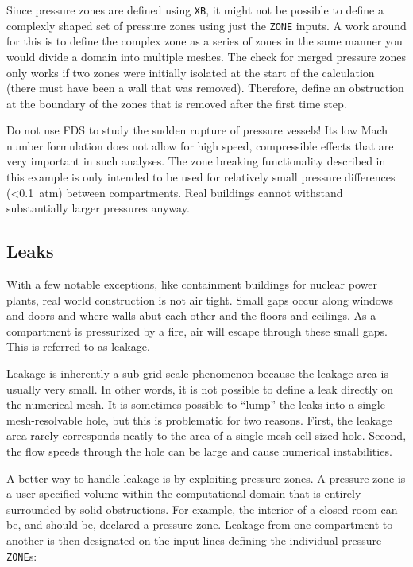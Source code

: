 \documentclass[11pt]{book}
\newcommand{\ct}{\tt\small}
\begin{document}
Since pressure zones are defined using {\ct XB}, it might not be possible to define a complexly shaped set of pressure zones using just the {\ct ZONE} inputs.  A work around for this is to define the complex zone as a series of zones in the same manner you would divide a domain into multiple meshes.  The check for merged pressure zones only works if two zones were initially isolated at the start of the calculation (there must have been a wall that was removed). Therefore, define an obstruction at the boundary of the zones that is removed after the first time step.

\begin{warning}
\noindent Do not use FDS to study the sudden rupture of pressure vessels! Its low Mach number formulation does not allow for high speed, compressible effects that
are very important in such analyses. The zone breaking functionality described in this example is only intended to be used for relatively small pressure differences (<0.1~atm)
between compartments. Real buildings cannot withstand substantially larger pressures anyway.
\end{warning}

\subsection{Leaks}
\label{info:Leaks}

With a few notable exceptions, like containment buildings for nuclear power plants, real world construction is not air tight.  Small gaps occur along windows and doors and where walls abut each other and the floors and ceilings.  As a compartment is pressurized by a fire, air will escape through these small gaps.  This is referred to as leakage.

Leakage is inherently a sub-grid scale phenomenon because the leakage area is usually very small. In other words, it is not possible to define a leak directly on the
numerical mesh. It is sometimes possible to ``lump'' the leaks into a single mesh-resolvable hole, but this is problematic
for two reasons. First, the leakage area rarely corresponds neatly to the area of a single mesh cell-sized hole. Second, the
flow speeds through the hole can be large and cause numerical instabilities.

A better way to handle leakage is by exploiting pressure zones. A pressure zone is a user-specified volume within the computational domain that is
entirely surrounded by solid obstructions. For example, the interior of a closed room can be, and should be, declared a pressure zone. Leakage from one
compartment to another is then designated on the input lines defining the individual pressure {\ct ZONE}s:
\end{document}
